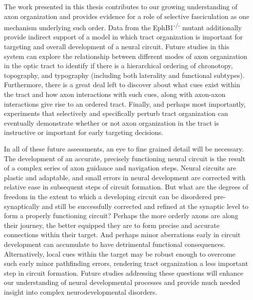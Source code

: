 The work presented in this thesis contributes to our growing understanding of axon organization and provides evidence for a role of selective fasciculation as one mechanism underlying such order.
Data from the EphB1\textsuperscript{-/-} mutant additionally provide indirect support of a model in which tract organization is important for targeting and overall development of a neural circuit.
Future studies in this system can explore the relationship between different modes of axon organization in the optic tract to identify if there is a hierarchical ordering of chronotopy, topography, and typography (including both laterality and functional subtypes).
Furthermore, there is a great deal left to discover about what cues exist within the tract and how axon interactions with such cues, along with axon-axon interactions give rise to an ordered tract.
Finally, and perhaps most importantly, experiments that selectively and specifically perturb tract organization can eventually demonstrate whether or not axon organization in the tract is instructive or important for early targeting decisions.

In all of these future assessments, an eye to fine grained detail will be necessary.
The development of an accurate, precisely functioning neural circuit is the result of a complex series of axon guidance and navigation steps.
Neural circuits are plastic and adaptable, and small errors in neural development are corrected with relative ease in subsequent steps of circuit formation.
But what are the degrees of freedom in the extent to which a developing circuit can be disordered pre-synaptically and still be successfully corrected and refined at the synaptic level to form a properly functioning circuit?
Perhaps the more orderly axons are along their journey, the better equipped they are to form precise and accurate connections within their target.
And perhaps minor aberrations early in circuit development can accumulate to have detrimental functional consequences.
Alternatively, local cues within the target may be robust enough to overcome such early minor pathfinding errors, rendering tract organization a less important step in circuit formation.
Future studies addressing these questions will enhance our understanding of neural developmental processes and provide much needed insight into complex neurodevelopmental disorders.